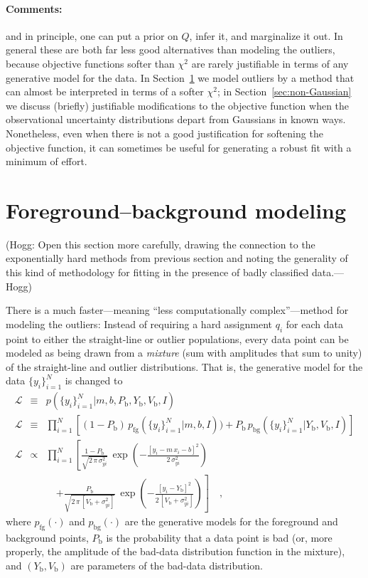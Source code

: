 \documentclass[12pt,twoside]{article}
\newcommand{\sectionname}{Section}
\newcommand{\commentsname}{Comments}
\newenvironment{comments}{\paragraph{\commentsname:}}{}
\newcommand{\setofall}[3]{\{{#1}\}_{{#2}}^{{#3}}}
\newcommand{\ally}{\setofall{y_i}{i=1}{N}}
\newcommand{\like}{\mathscr{L}}
\newcommand{\pfg}{p_{\mathrm{fg}}}
\newcommand{\pbg}{p_{\mathrm{bg}}}
\newcommand{\Pbad}{P_{\mathrm{b}}}
\newcommand{\Ybad}{Y_{\mathrm{b}}}
\newcommand{\Vbad}{V_{\mathrm{b}}}
\begin{document}
\begin{comments}
and in principle, one can put a prior on $Q$, infer it, and
marginalize it out.  In general these are both far less good
alternatives than modeling the outliers, because objective functions
softer than $\chi^2$ are rarely justifiable in terms of any generative
model for the data.  In \sectionname~\ref{sec:mixture} we model
outliers by a method that can almost be interpreted in terms of a
softer $\chi^2$; in \sectionname~\ref{sec:non-Gaussian} we discuss
(briefly) justifiable modifications to the objective function when the
observational uncertainty distributions depart from Gaussians in known
ways.  Nonetheless, even when there is not a good justification for
softening the objective function, it can sometimes be useful for
generating a robust fit with a minimum of effort.
\end{comments}

\section{Foreground--background modeling}\label{sec:mixture}

(Hogg: Open this section more carefully, drawing the connection to the
exponentially hard methods from previous section and noting the
generality of this kind of methodology for fitting in the presence of
badly classified data.---Hogg)

There is a much faster---meaning ``less computationally
complex''---method for modeling the outliers: Instead of requiring a
hard assignment $q_i$ for each data point to either the straight-line
or outlier populations, every data point can be modeled as being drawn
from a \emph{mixture} (sum with amplitudes that sum to unity) of the
straight-line and outlier distributions.  That is, the generative
model for the data $\ally$ is changed to
\begin{eqnarray}\label{eq:mixture}\displaystyle
\like &\equiv& p(\ally|m,b,\Pbad,\Ybad,\Vbad,I)
 \nonumber\\
\like &\equiv& \prod_{i=1}^N
 \left[ (1-\Pbad)\,\pfg(\ally|m,b,I))
 + \Pbad\,\pbg(\ally|\Ybad,\Vbad,I) \right]
 \nonumber\\
\like &\propto&
 \prod_{i=1}^N \left[\frac{1-\Pbad}{\sqrt{2\,\pi\,\sigma_{yi}^2}}
 \,\exp\left(-\frac{[y_i-m\,x_i-b]^2}{2\,\sigma_{yi}^2}\right)\right.
 \nonumber \\ & & \quad
 \left.+ \frac{\Pbad}{\sqrt{2\,\pi\,[\Vbad+\sigma_{yi}^2]}}
 \,\exp\left(-\frac{[y_i-\Ybad]^2}{2\,[\Vbad+\sigma_{yi}^2]}\right)\right]
 \quad ,
\end{eqnarray}
where $\pfg(\cdot)$ and $\pbg(\cdot)$ are the generative models for
the foreground and background points, $\Pbad$ is the probability that
a data point is bad (or, more properly, the amplitude of the bad-data
distribution function in the mixture), and $(\Ybad,\Vbad)$ are
parameters of the bad-data distribution.
\end{document}
